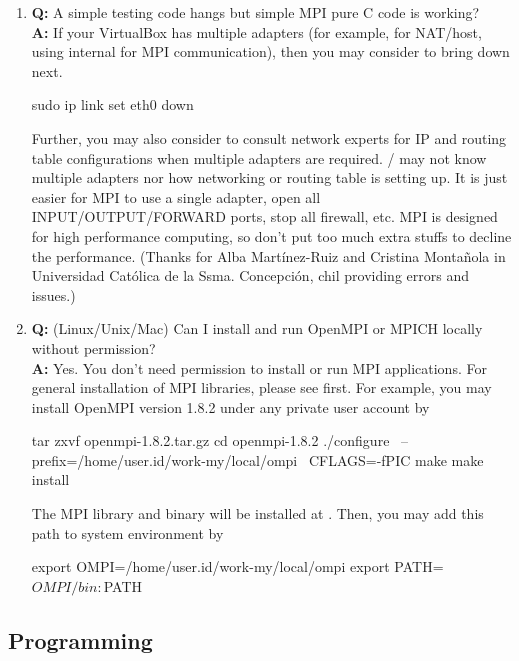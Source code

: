 \begin{enumerate}
\item {\bf\color{blue} Q:}
      A simple  testing code hangs but simple MPI pure C code is
      working? \\
      {\bf\color{blue} A:}
      If your VirtualBox has multiple adapters (for example,  for
      NAT/host,  using internal  for MPI
      communication), then you may consider to bring down  next.
\begin{Command}
sudo ip link set eth0 down
\end{Command}
      Further, you may also consider
      to consult network experts for IP and routing table configurations
      when multiple adapters are required.
      / may not know multiple adapters nor
      how networking or routing table is setting up. It is just easier for
      MPI to use a single adapter, open all INPUT/OUTPUT/FORWARD ports,
      stop all firewall, etc. MPI is designed for high performance computing,
      so don't put too much extra stuffs to decline the performance.
      (Thanks for Alba Mart\'{i}nez-Ruiz and Cristina Monta\~{n}ola in
       Universidad Cat\'{o}lica de la Ssma. Concepci\'{o}n, chil
       providing errors and issues.)

\item {\bf\color{blue} Q:}
      (Linux/Unix/Mac) Can I install and run OpenMPI or MPICH locally without
       permission? \\
      {\bf\color{blue} A:}
      Yes. You don't need  permission to install or run MPI
      applications.
      For general installation of MPI libraries, please see
       first.
      For example,
      you may install OpenMPI version 1.8.2 under any private user account by
\begin{Code}
tar zxvf openmpi-1.8.2.tar.gz
cd openmpi-1.8.2
./configure \
  --prefix=/home/user.id/work-my/local/ompi \
  CFLAGS=-fPIC
make
make install
\end{Code}
      The MPI library and binary will be installed at
      .
      Then, you may add this path
      to system environment \code{PATH} by
\begin{Code}
export OMPI=/home/user.id/work-my/local/ompi
export PATH=$OMPI/bin:$PATH
\end{Code}

\end{enumerate}


\subsection[Programming]{Programming}
\label{sec:programming}


